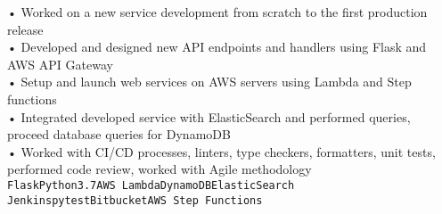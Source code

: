 {\begin{entrylist}
{			• Worked on a new service development from scratch to the first production release \\
            • Developed and designed new API endpoints and handlers using Flask and AWS API Gateway \\
            • Setup and launch web services on AWS servers using Lambda and Step functions \\
            • Integrated developed service with ElasticSearch and performed queries, proceed database queries for DynamoDB \\
            • Worked with CI/CD processes, linters, type checkers, formatters, unit tests, performed code review, worked with Agile methodology \\
			\texttt{Flask}\slashsep\texttt{Python3.7}\slashsep\texttt{AWS Lambda}\slashsep\texttt{DynamoDB}\slashsep\texttt{ElasticSearch}\\
			\texttt{Jenkins}\slashsep\texttt{pytest}\slashsep\texttt{Bitbucket}\slashsep\texttt{AWS Step Functions}
		}
	\end{entrylist}
}

\newcommand{\cvtemplateeducation}{Education}
\newcommand{\cveducation}{
	\begin{entrylist}
	    \entry
		{2018}
		{Python course, EPAM Systems}
		{Saint Petersburg}
		{
			Generally I studied Python on EPAM courses. During course, all main Python topics have been learnt
			and put into practice. My final project was written on Python, Flask.
			It was a web service for getting some statistics from external API and displaying it in graphs view.\\
			\texttt{Python3}\slashsep\texttt{Flask}
		}
		\entry
		{2014 – 2020}
		{Bachelor/Master's Degrees in Software Engineering, ITMO University}
		{Saint Petersburg}
		{
			I studied Software Engineering in University. My final project was written on Python, Django.
			It was a web service for saving educational results [certificates] based on Blockchain technology.\\
			\texttt{Python3}\slashsep\texttt{Django}\slashsep\texttt{SQLite}
		}
	\end{entrylist}
}

\newcommand{\cvtemplatecontacts}{Contacts}
\newcommand{\cvcontacts}{
	\icontext{MapMarker}{12}{Montenegro}\\
	\icontext{At}{12}{\href{mailto:valeriiashestakova@gmail.com}{valeriiashestakova@gmail.com}}\\
	\icontext{Github}{12}{\href{https://github.com/lerushe}{@lerushe}}\\
}
\newcommand{\cvtemplatelanguages}{Languages}
\newcommand{\cvlanguages}{
	\bubbles{
    	5/Russian,
    	4/English
	}{}
}
